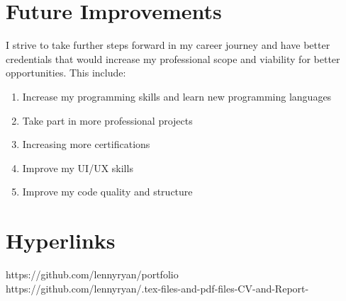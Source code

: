\documentclass[12pt,a4paper,oneside]{report}
\begin{document}
\section{Future Improvements}
I strive to take further steps forward in my career journey and have better credentials that would increase my professional scope and viability for better opportunities. This include:
\begin{enumerate}
    \item Increase my programming skills and learn new programming languages
    \item Take part in more professional projects
    \item Increasing more certifications 
    \item Improve my UI/UX skills
    \item Improve my code quality and structure
\end{enumerate}


\section{Hyperlinks}
https://github.com/lennyryan/portfolio\\
https://github.com/lennyryan/.tex-files-and-pdf-files-CV-and-Report-
\end{document}
